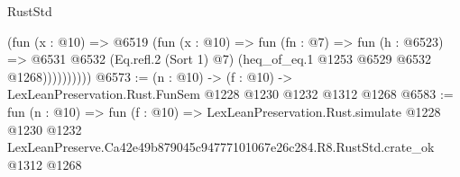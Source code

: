\begin{lexlean}{RustStd}
\begin{coremodule}
                  (fun (x : @10) =>
                  @6519
                    (fun (x : @10) =>
                    fun (fn : @7) =>
                    fun (h : @6523) =>
                    @6531
                      @6532
                      (Eq.refl.{2} (Sort 1) @7)
                      (heq_of_eq.{1} @1253 @6529 @6532 @1268))))))))))
@6573 := (n : @10) -> (f : @10) -> LexLeanPreservation.Rust.FunSem @1228 @1230 @1232 @1312 @1268
@6583 := fun (n : @10) =>
  fun (f : @10) =>
  LexLeanPreservation.Rust.simulate
    @1228
    @1230
    @1232
    LexLeanPreserve.Ca42e49b879045c94777101067e26c284.R8.RustStd.crate_ok
    @1312
    @1268
\end{coremodule}
\end{lexlean}
